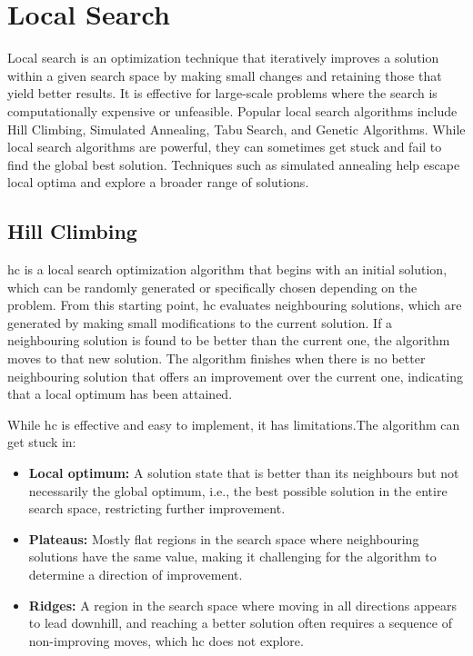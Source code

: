 \section{Local Search}

Local search is an optimization technique that iteratively improves a solution within a given search space by making small changes and retaining those that yield better results. It is effective for large-scale problems where the search is computationally expensive or unfeasible. Popular local search algorithms include Hill Climbing, Simulated Annealing, Tabu Search, and Genetic Algorithms. While local search algorithms are powerful, they can sometimes get stuck and fail to find the global best solution. Techniques such as simulated annealing help escape local optima and explore a broader range of solutions.

\subsection{Hill Climbing}

\ac{hc} is a local search optimization algorithm that begins with an initial solution, which can be randomly generated or specifically chosen depending on the problem. From this starting point, \ac{hc} evaluates neighbouring solutions, which are generated by making small modifications to the current solution. If a neighbouring solution is found to be better than the current one, the algorithm moves to that new solution. The algorithm finishes when there is no better neighbouring solution that offers an improvement over the current one, indicating that a local optimum has been attained. 

While \ac{hc} is effective and easy to implement, it has limitations.The algorithm can get stuck in:

\begin{itemize}
\item \textbf{Local optimum:} A solution state that is better than its neighbours but not necessarily the global optimum, i.e., the best possible solution in the entire search space, restricting further improvement.
\item \textbf{Plateaus:} Mostly flat regions in the search space where neighbouring solutions have the same value, making it challenging for the algorithm to determine a direction of improvement.
\item \textbf{Ridges:} A region in the search space where moving in all directions appears to lead downhill, and reaching a better solution often requires a sequence of non-improving moves, which \ac{hc} does not explore.
\end{itemize}

